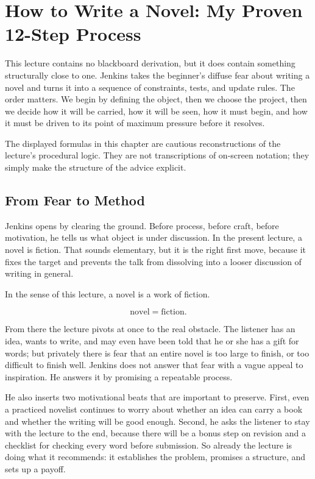\chapter{How to Write a Novel: My Proven 12-Step Process}

This lecture contains no blackboard derivation, but it does contain something structurally close to one. Jenkins takes the beginner's diffuse fear about writing a novel and turns it into a sequence of constraints, tests, and update rules. The order matters. We begin by defining the object, then we choose the project, then we decide how it will be carried, how it will be seen, how it must begin, and how it must be driven to its point of maximum pressure before it resolves.

\begin{remark}
The displayed formulas in this chapter are cautious reconstructions of the lecture's procedural logic. They are not transcriptions of on-screen notation; they simply make the structure of the advice explicit.
\end{remark}

\section{From Fear to Method}

Jenkins opens by clearing the ground. Before process, before craft, before motivation, he tells us what object is under discussion. In the present lecture, a novel is fiction. That sounds elementary, but it is the right first move, because it fixes the target and prevents the talk from dissolving into a looser discussion of writing in general.

\begin{definition}
In the sense of this lecture, a novel is a work of fiction.
\end{definition}

\begin{equation}
\text{novel}=\text{fiction}.
\end{equation}

From there the lecture pivots at once to the real obstacle. The listener has an idea, wants to write, and may even have been told that he or she has a gift for words; but privately there is fear that an entire novel is too large to finish, or too difficult to finish well. Jenkins does not answer that fear with a vague appeal to inspiration. He answers it by promising a repeatable process.

He also inserts two motivational beats that are important to preserve. First, even a practiced novelist continues to worry about whether an idea can carry a book and whether the writing will be good enough. Second, he asks the listener to stay with the lecture to the end, because there will be a bonus step on revision and a checklist for checking every word before submission. So already the lecture is doing what it recommends: it establishes the problem, promises a structure, and sets up a payoff.

